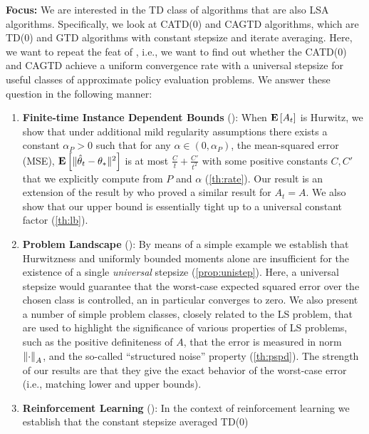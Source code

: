 \textbf{Focus:} We are interested in the TD class of algorithms that are also LSA algorithms. Specifically, we look at CATD(0) and CAGTD algorithms, which are TD(0) and GTD algorithms with constant stepsize and iterate averaging. Here, we want to repeat the feat of \cite{bach}, i.e., we want to find out whether the CATD(0) and CAGTD achieve a uniform convergence rate with a universal stepsize for useful classes of approximate policy evaluation problems. 
\fi
We answer these question in the following manner:
\begin{enumerate}[topsep=0pt,itemsep=1pt,wide, labelwidth=!, labelindent=0pt,label=\emph{\arabic*}.]
\item \textbf{Finite-time Instance Dependent Bounds} (): 
When $\mathbf{E}\left[A_t\right]$ is Hurwitz, we show that under additional mild regularity assumptions 
there exists a constant $\alpha_P>0$ such that for any $\alpha\in (0,\alpha_P)$,
the mean-squared error (MSE), $\mathbf{E}\left[\| \hat{\theta}_t-\theta_*\|^2\right]$
is at most $\frac{C}{t}+\frac{C'}{t^2}$ 
with some positive constants $C,C'$ that we explicitly compute from $P$ and $\alpha$
(\cref{th:rate}).
Our result is an extension of the result by \citet{polyak-judisky} who proved a similar result
for $A_t=A$. We also show that our upper bound is essentially tight up to a universal constant
factor (\cref{th:lb}).
\item \textbf{Problem Landscape} (): 
By means of a simple example we establish that 
Hurwitzness and uniformly bounded moments
alone are insufficient for the existence of a single \emph{universal} stepsize (\cref{prop:unistep}).
Here, a universal stepsize would guarantee that the worst-case expected squared 
error over the chosen class is controlled, an in particular converges to zero.
We also present a number of simple problem classes, closely related to the LS problem,
that are used to highlight the significance of various properties of LS problems,
such as the positive definiteness of $A$, that the error is measured in norm $\left\| \cdot\right\|_A$,
and the so-called ``structured noise'' property (\cref{th:pspd}).
The strength of our results are that they give the exact behavior of the worst-case error (i.e.,
matching lower and upper bounds).
\item \textbf{Reinforcement Learning} (): 
In the context of reinforcement learning we establish that the constant stepsize averaged TD($0$) 

\end{enumerate}
